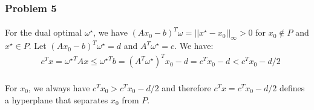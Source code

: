 \subsubsection*{Problem 5}
\paragraph{}
For the dual optimal $\omega^\star$, we have $(Ax_0 - b)^T\omega = ||x^\star-x_0||_\infty > 0$ for $x_0 \notin P$ and $x^\star \in P$. Let $(Ax_0 - b)^T \omega^\star = d$ and $A^T\omega^\star = c$. We have:
\begin{align*}
& c^Tx = {\omega^\star}^TAx \leq {\omega^\star}^Tb = (A^T\omega^\star)^Tx_0 - d =c^Tx_0 - d <c^Tx_0 -d/2
\end{align*}
\paragraph{}
For $x_0$, we always have $c^Tx_0 > c^Tx_0 -d/2$ and therefore $c^Tx = c^Tx_0 -d/2$ defines a hyperplane that separates $x_0$ from $P$.